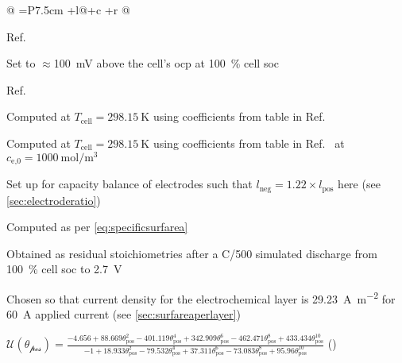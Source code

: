 \begin{table}[!htbp]
\begin{threeparttable}
\begin{tabular*}{\textwidth}{@{} =P{7.5cm}  +l@{\extracolsep{\fill}}+c +r @{}}
            \bottomrule
        \end{tabular*}

        \begin{tablenotes}
            \begin{scriptsize}
            \item[a] Ref.~\cite{Northrop2011}
            \item[b] Set to $\approx $\SI{100}{\milli\volt} above the cell's \gls{ocp} at \SI{100}{\percent} cell \gls{soc}
            \item[c] Ref.~\cite{Subramanian2009}
            \item[d] Computed at $T_\text{cell} = \SI{298.15}{\kelvin}$ using coefficients from table  in Ref.~\cite{Valoen2005}\\%
            \item[e] Computed at $T_\text{cell} = \SI{298.15}{\kelvin}$ using coefficients from table  in Ref.~\cite{Valoen2005} at $c_\text{e,0}= \SI{1000}{\mole\per\meter\cubed}$\\
            \item[f] Set up for capacity balance of electrodes such that $l_\text{neg} = 1.22 \times l_\text{pos}$ here (see \cref{sec:electroderatio})
            \item[g] Computed as per \cref{eq:specificsurfarea}\\
            \item[h] Obtained as residual stoichiometries after a C/\num{500} simulated discharge from \SI{100}{\percent} cell \gls{soc} to \SI{2.7}{V}
            \item[i] Chosen so that current density for the electrochemical layer is \SI{29.23}{\ampere\per\meter\squared} for \SI{60}{\ampere} applied current (see \cref{sec:surfareaperlayer})
            \end{scriptsize}
            \vspace{0.5ex}
        \item[k] $ \mathcal{U(\theta_\text{pos})} = \textstyle \frac{-4.656 + 88.669\theta_\text{pos}^2 - 401.119\theta_\text{pos}^4 + 342.909\theta_\text{pos}^6 - 462.471\theta_\text{pos}^8 + 433.434\theta_\text{pos}^{10}}{-1 + 18.933\theta_\text{pos}^2 - 79.532\theta_\text{pos}^4 + 37.311\theta_\text{pos}^6 - 73.083\theta_\text{pos}^8 + 95.96\theta_\text{pos}^{10}}$ \hspace*{\fill}(\theequation)\label{eq:lcoUocpPos}\\[0.25em]

\end{tablenotes}
\end{threeparttable}
\end{table}
